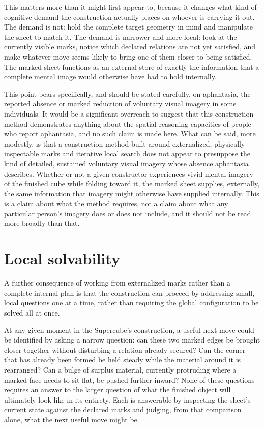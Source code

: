 \documentclass[11pt,oneside]{book}
\begin{document}
This matters more than it might first appear to, because it changes what
kind of cognitive demand the construction actually places on whoever is
carrying it out. The demand is not: hold the complete target geometry in
mind and manipulate the sheet to match it. The demand is narrower and
more local: look at the currently visible marks, notice which declared
relations are not yet satisfied, and make whatever move seems likely to
bring one of them closer to being satisfied. The marked sheet functions
as an external store of exactly the information that a complete mental
image would otherwise have had to hold internally.

This point bears specifically, and should be stated carefully, on
aphantasia, the reported absence or marked reduction of voluntary visual
imagery in some individuals. It would be a significant overreach to
suggest that this construction method demonstrates anything about the
spatial reasoning capacities of people who report aphantasia, and no
such claim is made here. What can be said, more modestly, is that a
construction method built around externalized, physically inspectable
marks and iterative local search does not appear to presuppose the kind
of detailed, sustained voluntary visual imagery whose absence aphantasia
describes. Whether or not a given constructor experiences vivid mental
imagery of the finished cube while folding toward it, the marked sheet
supplies, externally, the same information that imagery might otherwise
have supplied internally. This is a claim about what the method
requires, not a claim about what any particular person's imagery does or
does not include, and it should not be read more broadly than that.

\hypertarget{local-solvability}{%
\section{Local solvability}\label{local-solvability}}

A further consequence of working from externalized marks rather than a
complete internal plan is that the construction can proceed by
addressing small, local questions one at a time, rather than requiring
the global configuration to be solved all at once.

At any given moment in the Supercube's construction, a useful next move
could be identified by asking a narrow question: can these two marked
edges be brought closer together without disturbing a relation already
secured? Can the corner that has already been formed be held steady
while the material around it is rearranged? Can a bulge of surplus
material, currently protruding where a marked face needs to sit flat, be
pushed further inward? None of these questions requires an answer to the
larger question of what the finished object will ultimately look like in
its entirety. Each is answerable by inspecting the sheet's current state
against the declared marks and judging, from that comparison alone, what
the next useful move might be.
\end{document}
